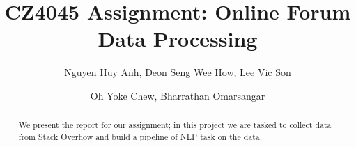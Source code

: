 \documentclass[sigconf]{acmart}
\begin{document}
\title{CZ4045 Assignment: Online Forum Data Processing}

\author{Nguyen Huy Anh, Deon Seng Wee How, Lee Vic Son}
\author{Oh Yoke Chew, Bharrathan Omarsangar}

\begin{abstract}
We present the report for our assignment; in this project we are tasked to
collect data from Stack Overflow and build a pipeline of NLP task on the data.
\end{abstract}

\renewcommand\footnotetextcopyrightpermission[1]{}

\maketitle




 
\end{document}
